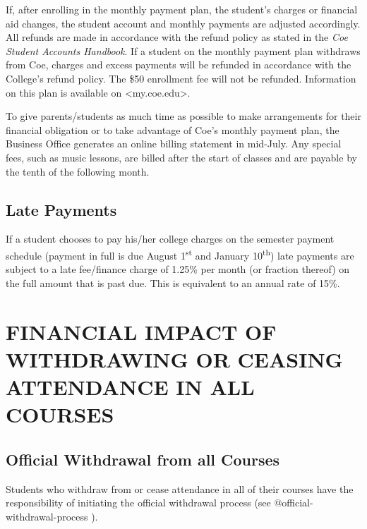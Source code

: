 \documentclass[
  letterpaper,
]{scrbook}
\begin{document}
If, after enrolling in the monthly payment plan, the student's charges
or financial aid changes, the student account and monthly payments are
adjusted accordingly. All refunds are made in accordance with the refund
policy as stated in the \emph{Coe Student Accounts Handbook}. If a
student on the monthly payment plan withdraws from Coe, charges and
excess payments will be refunded in accordance with the College's refund
policy. The \$50 enrollment fee will not be refunded. Information on
this plan is available on \textless my.coe.edu\textgreater.

To give parents/students as much time as possible to make arrangements
for their financial obligation or to take advantage of Coe's monthly
payment plan, the Business Office generates an online billing statement
in mid-July. Any special fees, such as music lessons, are billed after
the start of classes and are payable by the tenth of the following
month.

\hypertarget{late-payments}{%
\subsection{Late Payments}\label{late-payments}}

If a student chooses to pay his/her college charges on the semester
payment schedule (payment in full is due August 1\textsuperscript{st}
and January 10\textsuperscript{th}) late payments are subject to a late
fee/finance charge of 1.25\% per month (or fraction thereof) on the full
amount that is past due. This is equivalent to an annual rate of 15\%.

\hypertarget{financial-impact-of-withdrawing-or-ceasing-attendance-in-all-courses}{%
\section{FINANCIAL IMPACT OF WITHDRAWING OR CEASING ATTENDANCE IN ALL
COURSES}\label{financial-impact-of-withdrawing-or-ceasing-attendance-in-all-courses}}

\hypertarget{official-withdrawal-from-all-courses}{%
\subsection{Official Withdrawal from all
Courses}\label{official-withdrawal-from-all-courses}}

Students who withdraw from or cease attendance in all of their courses
have the responsibility of initiating the official withdrawal process
(see @official-withdrawal-process ).
\end{document}
